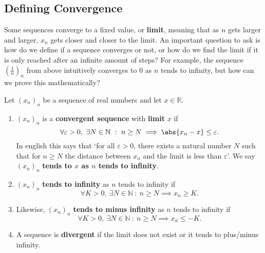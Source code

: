 \documentclass[../real_analysis.tex]{subfiles}
\begin{document}
        \subsection{Defining Convergence}\label{subsec:defining-convergence}
            Some sequences converge to a fixed value, or \textbf{limit}, meaning that as $n$ gets larger and larger, $x_n$ gets closer and closer to the limit. An important question to ask is how do we define if a sequence converges or not, or how do we find the limit if it is only reached after an infinite amount of steps? For example, the sequence $\left(\frac{1}{n}\right)_n$ from above intuitively converges to 0 as $n$ tends to infinity, but how can we prove this mathematically?
            \begin{definition}
                Let $(x_n)_n$ be a sequence of real numbers and let $x\in\mathbb{R}$.
                \begin{enumerate}
                    \item $(x_n)_n$ is a \textbf{convergent sequence} with \textbf{limit} $x$ if
                    \begin{equation}
                        \forall\varepsilon>0,\ \exists N\in\mathbb{N}\ :\ n\geq N\implies\abs{x_n-x}\leq\varepsilon.
                    \end{equation}
                    In english this says that `for all $\varepsilon>0$, there exists a natural number $N$ such that for $n\geq N$ the distance between $x_n$ and the limit is less than $\varepsilon$'. We say $(x_n)_n$ \textbf{tends to $x$ as $n$ tends to infinity}.
                    \item $(x_n)_n$ \textbf{tends to infinity} as $n$ tends to infinity if
                    \begin{equation}
                        \forall K>0,\ \exists N\in\mathbb{N}\ :\ n\geq N\implies x_n\geq K.
                    \end{equation}
                    \item Likewise, $(x_n)_n$ \textbf{tends to minus infinity} as $n$ tends to infinity if
                    \begin{equation}
                        \forall K>0,\ \exists N\in\mathbb{N}\ :\ n\geq N\implies x_n\leq -K.
                    \end{equation}
                    \item A sequence is \textbf{divergent} if the limit does not exist or it tends to plus/minus infinity.
                \end{enumerate}
            \end{definition}
\end{document}
